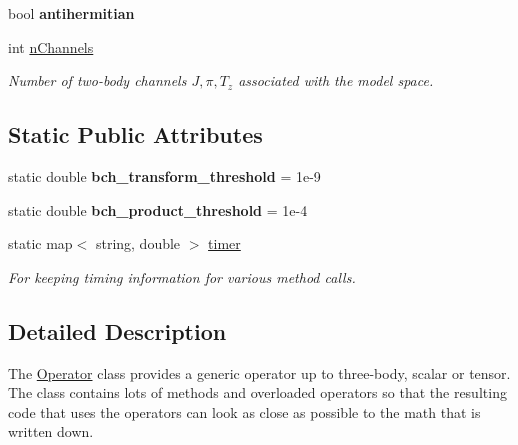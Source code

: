 \begin{DoxyCompactItemize}
\item 
\hypertarget{classOperator_a86dd30fca215948dd9307fa45b7a2e32}{bool {\bfseries antihermitian}}\label{classOperator_a86dd30fca215948dd9307fa45b7a2e32}

\item 
\hypertarget{classOperator_a710cd3c6107a4497e90a04c1f3d2b15f}{int \hyperlink{classOperator_a710cd3c6107a4497e90a04c1f3d2b15f}{n\-Channels}}\label{classOperator_a710cd3c6107a4497e90a04c1f3d2b15f}

\begin{DoxyCompactList}\small\item\em Number of two-\/body channels $ J,\pi,T_z $ associated with the model space. \end{DoxyCompactList}\end{DoxyCompactItemize}
\subsection*{Static Public Attributes}
\begin{DoxyCompactItemize}
\item 
\hypertarget{classOperator_af4743d3c6e99ebf1915b348447c8e688}{static double {\bfseries bch\-\_\-transform\-\_\-threshold} = 1e-\/9}\label{classOperator_af4743d3c6e99ebf1915b348447c8e688}

\item 
\hypertarget{classOperator_ad4a2ba438f3286ef22cc06b61f745993}{static double {\bfseries bch\-\_\-product\-\_\-threshold} = 1e-\/4}\label{classOperator_ad4a2ba438f3286ef22cc06b61f745993}

\item 
\hypertarget{classOperator_ae3de2afa3ff3dca088122a79404da831}{static map$<$ string, double $>$ \hyperlink{classOperator_ae3de2afa3ff3dca088122a79404da831}{timer}}\label{classOperator_ae3de2afa3ff3dca088122a79404da831}

\begin{DoxyCompactList}\small\item\em For keeping timing information for various method calls. \end{DoxyCompactList}\end{DoxyCompactItemize}


\subsection{Detailed Description}
The \hyperlink{classOperator}{Operator} class provides a generic operator up to three-\/body, scalar or tensor. The class contains lots of methods and overloaded operators so that the resulting code that uses the operators can look as close as possible to the math that is written down. 

